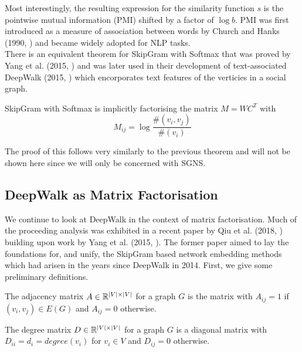 \documentclass[a4paper]{article}
\begin{document}
\noindent Most interestingly, the resulting expression for the similarity function $s$ is
the pointwise mutual information (PMI) shifted by a factor of $\log b$. PMI was
first introduced as a measure of association between words by Church and Hanks
(1990, \cite{church1990}) and became widely adopted for NLP tasks.\\
There is an equivalent theorem for SkipGram with Softmax that was proved by Yang
et al. (2015, \cite{yangalternative2015}) and was later used in their development of
text-associated DeepWalk (2015, \cite{yang2015}) which encorporates text features
of the verticies in a social graph.

\begin{theorem}[Yang et al. (2015)]
  SkipGram with Softmax is implicitly factorising the matrix $M = WC^T$ with
  \[M_{ij} = \log{\frac{\#(v_i,v_j)}{\#(v_i)}}\]
\end{theorem}
The proof of this follows very similarly to the previous theorem and will not be
shown here since we will only be concerned with SGNS.

\subsection{DeepWalk as Matrix Factorisation}
We continue to look at DeepWalk in the context of matrix factorisation. Much of the proceeding analysis was exhibited in a recent paper by Qiu et
al. (2018, \cite{qiu2018}) building upon work by Yang et al. (2015, \cite{yang2015}). The former paper aimed to lay the foundations for, and
unify, the SkipGram based network embedding methods which had arisen in the years since DeepWalk in 2014. First, we give some preliminary definitions.
\begin{definition}
  The adjacency matrix $A \in \R^{|V| \times |V|}$ for a graph $G$ is the matrix with $A_{ij} = 1$ if $(v_i, v_j) \in E(G)$ and $A_{ij} = 0$ otherwise.
\end{definition}

\begin{definition}
  The degree matrix $D \in \R^{|V| \times |V|}$ for a graph $G$ is a diagonal
  matrix with $D_{ii} = d_i = degree(v_i)$ for $v_i \in V$ and $D_{ij} = 0$ otherwise.
\end{definition}
\end{document}
